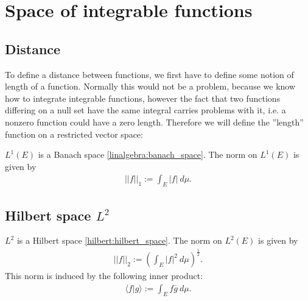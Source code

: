 \section{Space of integrable functions}
\subsection{Distance}

    To define a distance between functions, we first have to define some notion of length of a function. Normally this would not be a problem, because we know how to integrate integrable functions, however the fact that two functions differing on a null set have the same integral carries problems with it, i.e. a nonzero function could have a zero length. Therefore we will define the ''length'' function on a restricted vector space:
    \begin{property}
        $L^1(E)$ is a Banach space \ref{linalgebra:banach_space}. The norm on $L^1(E)$ is given by
        \begin{gather}
            \label{lebesgue:L1_norm}
            ||f||_1 := \int_E |f|\ d\mu.
        \end{gather}
    \end{property}

\subsection{Hilbert space \texorpdfstring{$L^2$}{L2}}\label{lebesgue:section:hilbert_space}

    \begin{property}\label{lebesgue:L2_hilbert_space}
        $L^2$ is a Hilbert space \ref{hilbert:hilbert_space}. The norm on $L^2(E)$ is given by
        \begin{gather}
            \label{lebesgue:L2_norm}
            ||f||_2 := \left(\int_E |f|^2\ d\mu\right)^{\frac{1}{2}}.
        \end{gather}
        This norm is induced by the following inner product:
        \begin{gather}
            \label{lebesgue:L2_inner_product}
            \langle f|g \rangle := \int_E f\overline{g}\ d\mu.
        \end{gather}
    \end{property}

